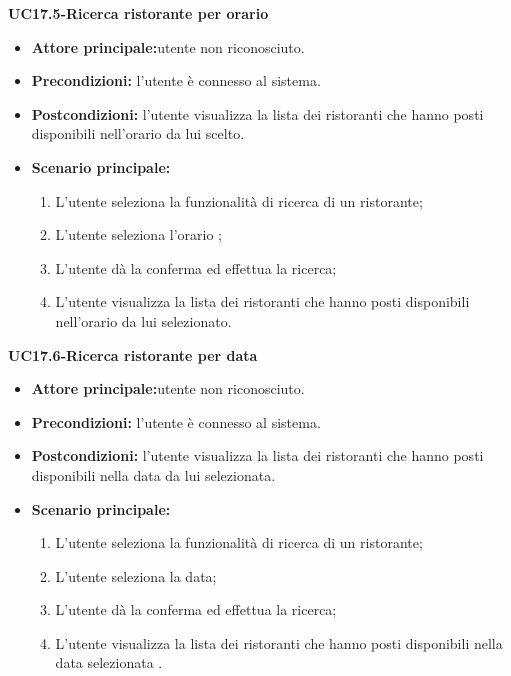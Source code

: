 \textbf{UC17.5-Ricerca ristorante per orario}
\begin{itemize}
\item \textbf{Attore principale:}utente non riconosciuto.
\item \textbf{Precondizioni:} l'utente è connesso al sistema.
\item \textbf{Postcondizioni:} l'utente visualizza la lista dei ristoranti che hanno posti disponibili nell'orario 
da lui scelto.
\item \textbf{Scenario principale:}
\begin{enumerate}
    \item L'utente seleziona la funzionalità di ricerca di un ristorante;
    \item L'utente seleziona l'orario ;
    \item L'utente dà la conferma ed effettua la ricerca;
    \item L'utente visualizza la lista dei ristoranti che hanno posti disponibili nell'orario da lui
    selezionato.
\end{enumerate}
\end{itemize}

\textbf{UC17.6-Ricerca ristorante per data}
\begin{itemize}
\item \textbf{Attore principale:}utente non riconosciuto.
\item \textbf{Precondizioni:} l'utente è connesso al sistema.
\item \textbf{Postcondizioni:} l'utente visualizza la lista dei ristoranti che hanno posti disponibili
nella data da lui selezionata.
\item \textbf{Scenario principale:}
\begin{enumerate}
    \item L'utente seleziona la funzionalità di ricerca di un ristorante;
    \item L'utente seleziona la data;
    \item L'utente dà la conferma ed effettua la ricerca;
    \item L'utente visualizza la lista dei ristoranti che hanno posti disponibili
    nella data selezionata .
\end{enumerate}
\end{itemize}

